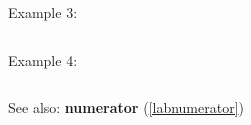 \noindent Example 3: 
\begin{center}\begin{minipage}{15cm}\begin{Verbatim}[frame=single]
\end{Verbatim}
\end{minipage}\end{center}
\noindent Example 4: 
\begin{center}\begin{minipage}{15cm}\begin{Verbatim}[frame=single]
\end{Verbatim}
\end{minipage}\end{center}
See also: \textbf{numerator} (\ref{labnumerator})
